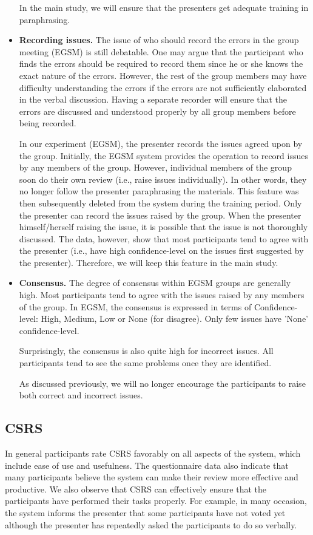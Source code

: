 \begin{itemize}
In the main study, we will ensure that the presenters get adequate
training in paraphrasing. 

\item {\bf Recording issues.}
The issue of who should record the errors in the group meeting (EGSM)
is still debatable. One may argue that the participant who finds the
errors should be required to record them since he or she knows the
exact nature of the errors. However, the rest of the group members may
have difficulty understanding the errors if the errors are not
sufficiently elaborated in the verbal discussion. Having a separate
recorder will ensure that the errors are discussed and understood
properly by all group members before being recorded. 

In our experiment (EGSM), the presenter records the issues agreed 
upon by the group. Initially, the EGSM system provides the operation
to record issues by any members of the group.
However, individual members of the
group soon do their own review (i.e., raise issues individually).
In other words, they no longer follow the presenter paraphrasing the
materials. 
This feature was then subsequently deleted from the system during
the training period. Only the presenter can record the issues raised
by the group. 
When the presenter himself/herself raising the 
issue, it is possible that the issue is not thoroughly discussed. The
data, however, show that most participants tend to agree with the
presenter (i.e., have high confidence-level on the issues first
suggested by the presenter). Therefore, we will keep this feature in
the main study.


\item {\bf Consensus.}
The degree of consensus within EGSM groups are generally high. Most
participants tend to agree with the issues raised by any members of
the group.  In EGSM, the consensus is expressed in terms of
Confidence-level: High, Medium, Low or None (for disagree). Only few
issues have 'None' confidence-level. 

Surprisingly, the consensus is also quite high for incorrect
issues. All participants tend to see the same problems once
they are identified.

As discussed previously, we will no longer encourage the participants
to raise both correct and incorrect issues.

\end{itemize}

\subsection{CSRS}
In general participants rate CSRS favorably on all aspects of the
system, which include ease of use and usefulness. The questionnaire
data also indicate that many participants believe the system can
make their review more effective and productive. 
We also observe that CSRS can effectively ensure that the
participants have performed their tasks properly. For example, 
in many occasion, the system informs
the presenter that some participants have not voted yet
although the presenter has repeatedly asked the participants to do so 
verbally. 

